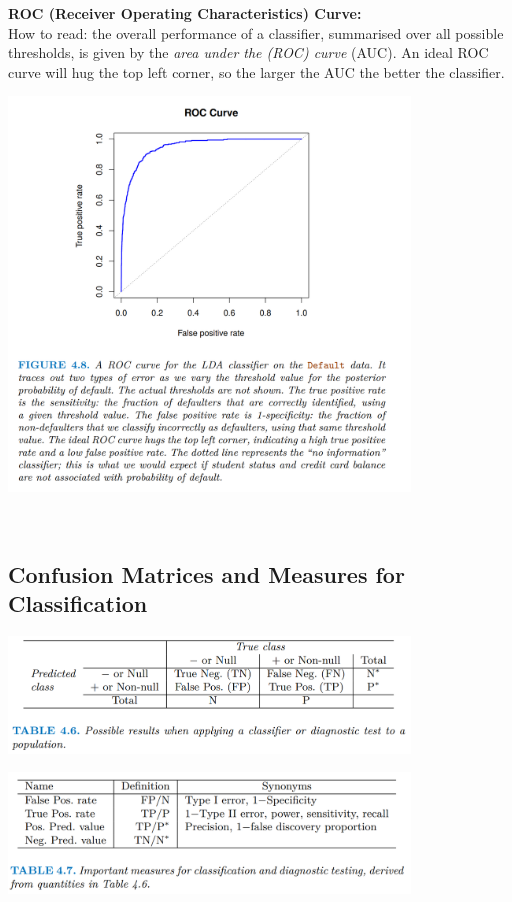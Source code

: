 \documentclass[11pt]{article}
\begin{document}
\vspace{7em}
\noindent \textbf{ROC (Receiver Operating Characteristics) Curve:} \\
\noindent How to read: the overall performance of a classifier, summarised over all possible thresholds, is given by the \textit{area under the (ROC) curve} (AUC). An ideal ROC curve will hug the top left corner, so the larger the AUC the better the classifier.
\begin{center}
  \includegraphics[width=0.8\textwidth]{LDA Example ROC Curve.png}
\end{center}
\phantom{i}\\

\subsection{Confusion Matrices and Measures for Classification}

\begin{center}
  \includegraphics[width=0.8\textwidth]{Classificaiton Confusion Matrix Definition.png}
\end{center}

\begin{center}
  \includegraphics[width=0.8\textwidth]{Measures of Classification.png}
\end{center}
\end{document}
